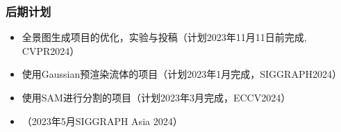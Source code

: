 \begin{frame}
    \frametitle{后期计划}
    \begin{itemize}
        \item 全景图生成项目的优化，实验与投稿（计划2023年11月11日前完成, CVPR2024）
        \item 使用Gaussian预渲染流体的项目（计划2023年1月完成，SIGGRAPH2024）
        \item 使用SAM进行分割的项目（计划2023年3月完成，ECCV2024）
        \item （2023年5月SIGGRAPH Asia 2024）
    \end{itemize}
\end{frame}
